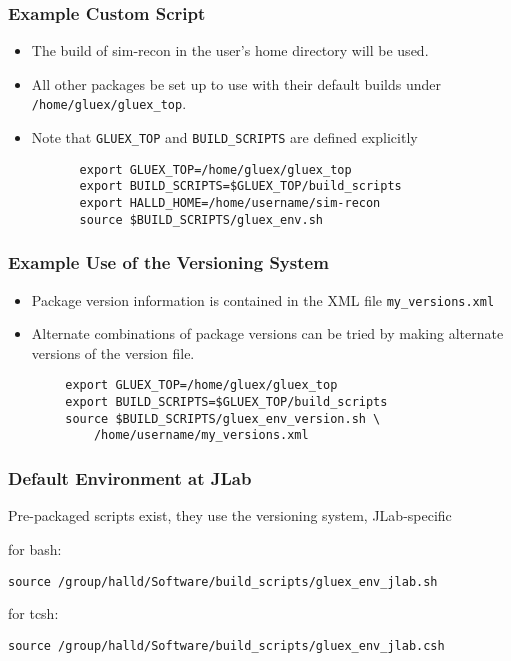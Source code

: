 \documentclass{beamer}
\newcommand{\bi}{\begin{itemize}}
\newcommand{\ei}{\end{itemize}}
\newcommand{\I}{\item}
\begin{document}
\begin{frame}[fragile]
  \frametitle{Example Custom Script}
\bi
\I The build of sim-recon in the user's home directory will be used.
\I All other packages be set up to use with their default builds under {\tt
    /home/gluex/gluex\_top}.
\I Note that {\tt GLUEX\_TOP} and {\tt BUILD\_SCRIPTS} are defined explicitly
\ei
\begin{verbatim}
          export GLUEX_TOP=/home/gluex/gluex_top
          export BUILD_SCRIPTS=$GLUEX_TOP/build_scripts
          export HALLD_HOME=/home/username/sim-recon
          source $BUILD_SCRIPTS/gluex_env.sh
\end{verbatim}

\end{frame}
\begin{frame}[fragile]
  \frametitle{Example Use of the Versioning System}
\bi
\I Package version information is contained in the XML file {\tt my\_versions.xml}
\I Alternate combinations of package versions can be tried by making alternate versions of the version file.
\ei
\begin{verbatim}
        export GLUEX_TOP=/home/gluex/gluex_top
        export BUILD_SCRIPTS=$GLUEX_TOP/build_scripts
        source $BUILD_SCRIPTS/gluex_env_version.sh \
            /home/username/my_versions.xml
\end{verbatim}

\end{frame}
\begin{frame}[fragile]
  \frametitle{Default Environment at JLab}
Pre-packaged scripts exist, they use the versioning system, JLab-specific

for bash:
\begin{verbatim}
source /group/halld/Software/build_scripts/gluex_env_jlab.sh
\end{verbatim}
for tcsh:
\begin{verbatim}
source /group/halld/Software/build_scripts/gluex_env_jlab.csh
\end{verbatim}

\end{frame}
\end{document}
